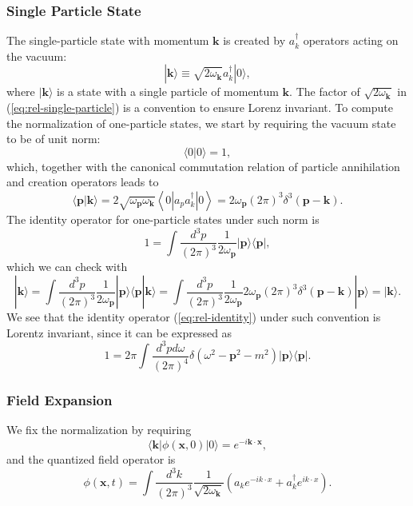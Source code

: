 \subsubsection{Single Particle State}
The single-particle state with momentum $\bm k$ is created by $a_{k}^{\dagger}$ operators acting on the vacuum:
\begin{equation}
	|\bm{k}\rangle \equiv \sqrt{2\omega_{\bm k}} a_{k}^{\dagger}|0\rangle,
	\label{eq:rel-single-particle}
\end{equation}
where $|\bm{k}\rangle$ is a state with a single particle of momentum $\bm{k}$.
The factor of $\sqrt{2 \omega_{\bm k}}$ in (\ref{eq:rel-single-particle}) is a convention to ensure Lorenz invariant.
To compute the normalization of one-particle states, we start by requiring the vacuum state to be of unit norm:
\begin{equation}
	\langle 0|0\rangle=1,
\end{equation}
which, together with the canonical commutation relation of particle annihilation and creation operators leads to
\begin{equation}
	\langle\bm{p}|\bm{k}\rangle 
	= 2\sqrt{\omega_{\bm p} \omega_{\bm k}}\left\langle 0\left|a_{p} a_{k}^{\dagger}\right| 0\right\rangle
	= 2 \omega_{\bm p}(2\pi)^{3} \delta^{3}(\bm{p}-\bm{k}).
\end{equation}
The identity operator for one-particle states under such norm is
\begin{equation}
	1=\int \frac{d^{3} p}{(2\pi)^{3}} \frac{1}{2\omega_{\bm p}}|\bm{p}\rangle\langle\bm{p}|, \label{eq:rel-identity}
\end{equation}
which we can check with
\begin{equation*}
	|\bm{k}\rangle
	=\int \frac{d^{3} p}{(2\pi)^{3}} \frac{1}{2\omega_{\bm p}}|\bm{p}\rangle\langle\bm{p}|\bm{k}\rangle
	=\int \frac{d^{3} p}{(2\pi)^{3}} \frac{1}{2\omega_{\bm p}} 2\omega_{\bm p}(2\pi)^3 \delta^3(\bm{p}-\bm{k})|\bm{p}\rangle
	=|\bm{k}\rangle.
\end{equation*}
We see that the identity operator (\ref{eq:rel-identity}) under such convention is Lorentz invariant, since it can be expressed as
\begin{equation}
	1 = 2\pi \int \frac{d^{3} p d\omega}{(2\pi)^{4}} \delta(\omega^2-{\bm{p}}^2-m^2) |\bm p\rangle\langle \bm p|.
\end{equation}

\subsubsection{Field Expansion}
We fix the normalization by requiring 
\begin{equation}
	\langle \bm k|\phi(\bm x,0)|0\rangle = e^{-i \bm k\cdot \bm x},
\end{equation}
and the quantized field operator is
\begin{equation}
	\phi(\bm{x}, t)
	=\int \frac{d^{3} k}{(2\pi)^{3}} \frac{1}{\sqrt{2\omega_{\bm k}}}\left(a_k 
	e^{-i k \cdot x}+a_k^{\dagger} e^{i k \cdot x}\right).
\end{equation}

